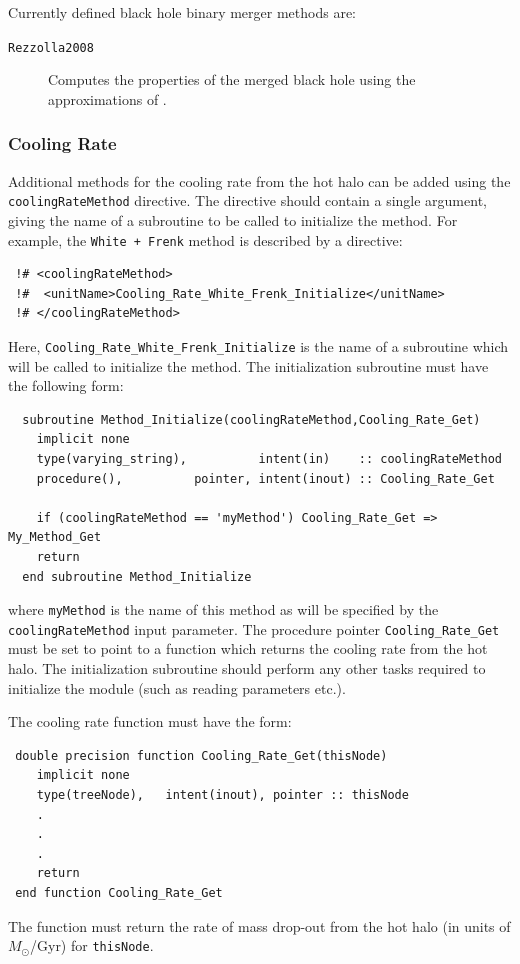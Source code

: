 Currently defined black hole binary merger methods are:
\begin{description}
 \item [{\tt Rezzolla2008}] Computes the properties of the merged black hole using the approximations of \cite{rezzolla_final_2008}.
\end{description}

\subsubsection{Cooling Rate}

Additional methods for the cooling rate from the hot halo can be added using the {\tt coolingRateMethod} directive. The directive should contain a single argument, giving the name of a subroutine to be called to initialize the method. For example, the {\tt White + Frenk} method is described by a directive:
\begin{verbatim}
 !# <coolingRateMethod>
 !#  <unitName>Cooling_Rate_White_Frenk_Initialize</unitName>
 !# </coolingRateMethod>
\end{verbatim}
Here, {\tt Cooling\_Rate\_White\_Frenk\_Initialize} is the name of a subroutine which will be called to initialize the method. The initialization subroutine must have the following form:
\begin{verbatim}
  subroutine Method_Initialize(coolingRateMethod,Cooling_Rate_Get)
    implicit none
    type(varying_string),          intent(in)    :: coolingRateMethod
    procedure(),          pointer, intent(inout) :: Cooling_Rate_Get
    
    if (coolingRateMethod == 'myMethod') Cooling_Rate_Get => My_Method_Get
    return
  end subroutine Method_Initialize
\end{verbatim}
where {\tt myMethod} is the name of this method as will be specified by the {\tt coolingRateMethod} input parameter. The procedure pointer {\tt Cooling\_Rate\_Get} must be set to point to a function which returns the cooling rate from the hot halo. The initialization subroutine should perform any other tasks required to initialize the module (such as reading parameters etc.).

The cooling rate function must have the form:
\begin{verbatim}
 double precision function Cooling_Rate_Get(thisNode)
    implicit none
    type(treeNode),   intent(inout), pointer :: thisNode
    .
    .
    .
    return
 end function Cooling_Rate_Get
\end{verbatim}
The function must return the rate of mass drop-out from the hot halo (in units of $M_\odot$/Gyr) for {\tt thisNode}. 


